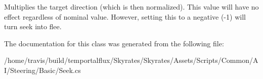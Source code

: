 Multiplies the target direction (which is then normalized). This value will have no effect regardless of nominal value. However, setting this to a negative (-\/1) will turn seek into flee. 



The documentation for this class was generated from the following file\-:\begin{DoxyCompactItemize}
\item 
/home/travis/build/temportalflux/\-Skyrates/\-Skyrates/\-Assets/\-Scripts/\-Common/\-A\-I/\-Steering/\-Basic/Seek.\-cs\end{DoxyCompactItemize}
